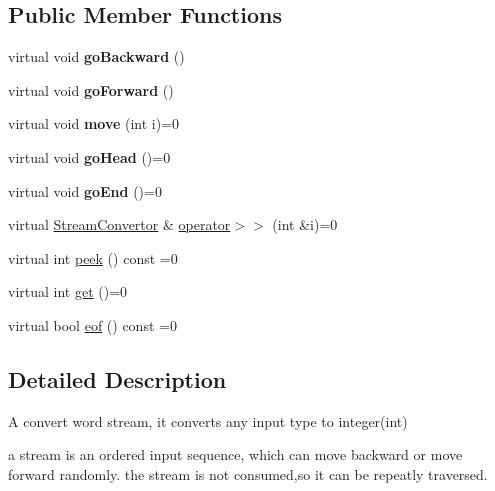 \subsection*{Public Member Functions}
\begin{DoxyCompactItemize}
\item 
\mbox{\label{classx2_1_1_stream_convertor_a876b8e8c24be22071be077131d630653}} 
virtual void {\bfseries go\+Backward} ()
\item 
\mbox{\label{classx2_1_1_stream_convertor_a139c6530279fa6c4539aec126e8d18a5}} 
virtual void {\bfseries go\+Forward} ()
\item 
\mbox{\label{classx2_1_1_stream_convertor_a5496244c269c2c59aaa8b596bf4e6e93}} 
virtual void {\bfseries move} (int i)=0
\item 
\mbox{\label{classx2_1_1_stream_convertor_ad6e8220fe474334d95d0361f7bd301c4}} 
virtual void {\bfseries go\+Head} ()=0
\item 
\mbox{\label{classx2_1_1_stream_convertor_ab2a5c8c756da383dac62ef7e5ba15953}} 
virtual void {\bfseries go\+End} ()=0
\item 
virtual \hyperlink{classx2_1_1_stream_convertor}{Stream\+Convertor} \& \hyperlink{classx2_1_1_stream_convertor_a5b387cc560794db5ac2f0c35dd4023d1}{operator$>$$>$} (int \&i)=0
\item 
virtual int \hyperlink{classx2_1_1_stream_convertor_a9bc76cb1b81f1b11c9967f37f01bf2be}{peek} () const =0
\item 
virtual int \hyperlink{classx2_1_1_stream_convertor_a1025f8d8b1b1e430a6476d74e2506b10}{get} ()=0
\item 
virtual bool \hyperlink{classx2_1_1_stream_convertor_a64febc08c310555497ca497df583b940}{eof} () const =0
\end{DoxyCompactItemize}


\subsection{Detailed Description}
A convert word stream, it converts any input type to integer(int) 

a stream is an ordered input sequence, which can move backward or move forward randomly. the stream is not consumed,so it can be repeatly traversed.

